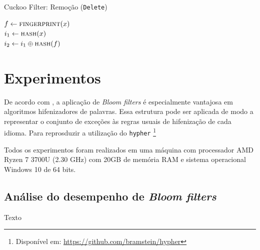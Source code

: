 \documentclass[12pt,twoside,english,brazilian]{book}
\begin{document}
\begin{algorithm}
    \caption{Cuckoo Filter: Remoção (\texttt{Delete})}\label{alg:cf-rem}

    $f \leftarrow \Call{fingerprint}{x}$ \\
    $i_1 \leftarrow \Call{hash}{x}$ \\
    $i_2 \leftarrow i_1 \oplus \Call{hash}{f}$ \\
\end{algorithm}

\clearpage

\chapter{Experimentos}

De acordo com \citet{bloom}, a aplicação de \textit{Bloom filters} é especialmente vantajosa em algoritmos hifenizadores de palavras. Essa estrutura pode ser aplicada de modo a representar o conjunto de exceções às regras usuais de hifenização de cada idioma. Para reprosduzir a utilização do \texttt{hypher} \footnote{Disponível em: \url{https://github.com/bramstein/hypher}}

Todos os experimentos foram realizados em uma máquina com processador AMD Ryzen 7 3700U (2.30 GHz) com 20GB de memória RAM e sistema operacional Windows 10 de 64 bits.

\section{Análise do desempenho de \textit{Bloom filters}}

Texto
\end{document}

